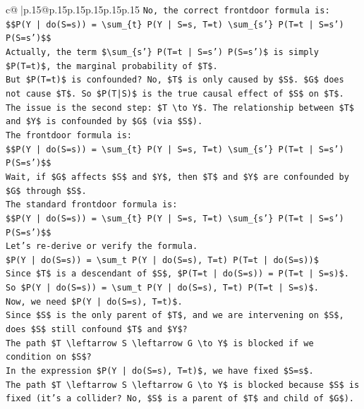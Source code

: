 \documentclass{article}
\begin{document}
{\begin{supertabular}{c@{$\;$}|p{.15\linewidth}@{}p{.15\linewidth}p{.15\linewidth}p{.15\linewidth}p{.15\linewidth}p{.15\linewidth}}
{{{\texttt{No, the correct frontdoor formula is:} \\
\texttt{\$\$P(Y | do(S=s)) = \textbackslash{}sum\_\{t\} P(Y | S=s, T=t) \textbackslash{}sum\_\{s'\} P(T=t | S=s') P(S=s')\$\$} \\
\texttt{Actually, the term \$\textbackslash{}sum\_\{s'\} P(T=t | S=s') P(S=s')\$ is simply \$P(T=t)\$, the marginal probability of \$T\$.} \\
\texttt{But \$P(T=t)\$ is confounded? No, \$T\$ is only caused by \$S\$. \$G\$ does not cause \$T\$. So \$P(T|S)\$ is the true causal effect of \$S\$ on \$T\$.} \\
\texttt{The issue is the second step: \$T \textbackslash{}to Y\$. The relationship between \$T\$ and \$Y\$ is confounded by \$G\$ (via \$S\$).} \\
\texttt{The frontdoor formula is:} \\
\texttt{\$\$P(Y | do(S=s)) = \textbackslash{}sum\_\{t\} P(Y | S=s, T=t) \textbackslash{}sum\_\{s'\} P(T=t | S=s') P(S=s')\$\$} \\
\texttt{Wait, if \$G\$ affects \$S\$ and \$Y\$, then \$T\$ and \$Y\$ are confounded by \$G\$ through \$S\$.} \\
\texttt{The standard frontdoor formula is:} \\
\texttt{\$\$P(Y | do(S=s)) = \textbackslash{}sum\_\{t\} P(Y | S=s, T=t) \textbackslash{}sum\_\{s'\} P(T=t | S=s') P(S=s')\$\$} \\
\texttt{Let's re{-}derive or verify the formula.} \\
\texttt{\$P(Y | do(S=s)) = \textbackslash{}sum\_t P(Y | do(S=s), T=t) P(T=t | do(S=s))\$} \\
\texttt{Since \$T\$ is a descendant of \$S\$, \$P(T=t | do(S=s)) = P(T=t | S=s)\$.} \\
\texttt{So \$P(Y | do(S=s)) = \textbackslash{}sum\_t P(Y | do(S=s), T=t) P(T=t | S=s)\$.} \\
\texttt{Now, we need \$P(Y | do(S=s), T=t)\$.} \\
\texttt{Since \$S\$ is the only parent of \$T\$, and we are intervening on \$S\$, does \$S\$ still confound \$T\$ and \$Y\$?} \\
\texttt{The path \$T \textbackslash{}leftarrow S \textbackslash{}leftarrow G \textbackslash{}to Y\$ is blocked if we condition on \$S\$?} \\
\texttt{In the expression \$P(Y | do(S=s), T=t)\$, we have fixed \$S=s\$.} \\
\texttt{The path \$T \textbackslash{}leftarrow S \textbackslash{}leftarrow G \textbackslash{}to Y\$ is blocked because \$S\$ is fixed (it's a collider? No, \$S\$ is a parent of \$T\$ and child of \$G\$).} \\
}}}
\end{supertabular}}
\end{document}
